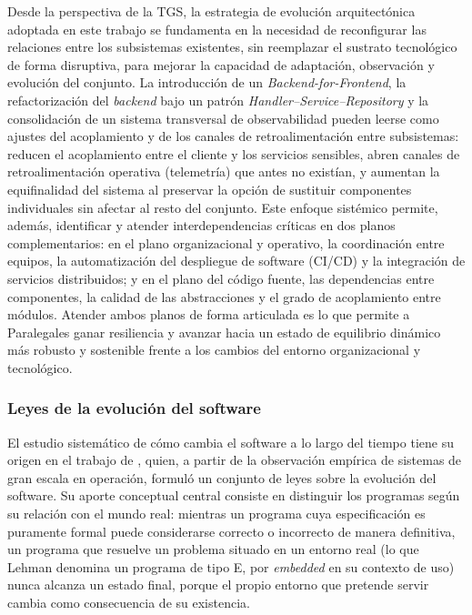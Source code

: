 Desde la perspectiva de la TGS, la estrategia de evolución arquitectónica adoptada en este trabajo se fundamenta en la necesidad de reconfigurar las relaciones entre los subsistemas existentes, sin reemplazar el sustrato tecnológico de forma disruptiva, para mejorar la capacidad de adaptación, observación y evolución del conjunto. La introducción de un \textit{Backend-for-Frontend}, la refactorización del \textit{backend} bajo un patrón \textit{Handler--Service--Repository} y la consolidación de un sistema transversal de observabilidad pueden leerse como ajustes del acoplamiento y de los canales de retroalimentación entre subsistemas: reducen el acoplamiento entre el cliente y los servicios sensibles, abren canales de retroalimentación operativa (telemetría) que antes no existían, y aumentan la equifinalidad del sistema al preservar la opción de sustituir componentes individuales sin afectar al resto del conjunto. Este enfoque sistémico permite, además, identificar y atender interdependencias críticas en dos planos complementarios: en el plano organizacional y operativo, la coordinación entre equipos, la automatización del despliegue de software (CI/CD) y la integración de servicios distribuidos; y en el plano del código fuente, las dependencias entre componentes, la calidad de las abstracciones y el grado de acoplamiento entre módulos. Atender ambos planos de forma articulada es lo que permite a Paralegales ganar resiliencia y avanzar hacia un estado de equilibrio dinámico más robusto y sostenible frente a los cambios del entorno organizacional y tecnológico.

\subsubsection{Leyes de la evolución del software}

El estudio sistemático de cómo cambia el software a lo largo del tiempo tiene su origen en el trabajo de \textcite{Lehman1980}, quien, a partir de la observación empírica de sistemas de gran escala en operación, formuló un conjunto de leyes sobre la evolución del software. Su aporte conceptual central consiste en distinguir los programas según su relación con el mundo real: mientras un programa cuya especificación es puramente formal puede considerarse correcto o incorrecto de manera definitiva, un programa que resuelve un problema situado en un entorno real (lo que Lehman denomina un programa de tipo E, por \textit{embedded} en su contexto de uso) nunca alcanza un estado final, porque el propio entorno que pretende servir cambia como consecuencia de su existencia.

